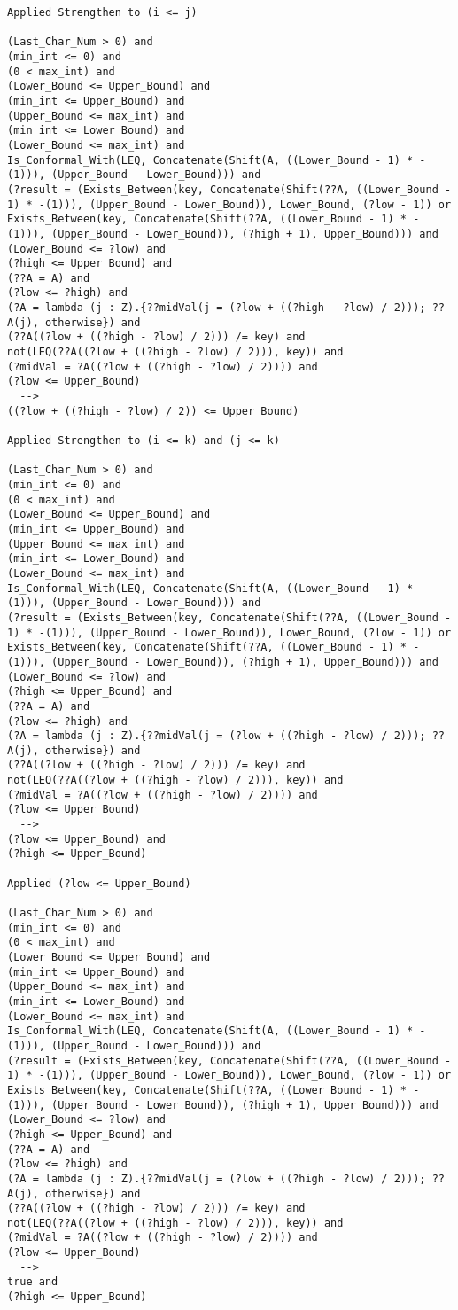 \begin{lstlisting}[language=resolve]
Applied Strengthen to (i <= j)

(Last_Char_Num > 0) and
(min_int <= 0) and
(0 < max_int) and
(Lower_Bound <= Upper_Bound) and
(min_int <= Upper_Bound) and
(Upper_Bound <= max_int) and
(min_int <= Lower_Bound) and
(Lower_Bound <= max_int) and
Is_Conformal_With(LEQ, Concatenate(Shift(A, ((Lower_Bound - 1) * -(1))), (Upper_Bound - Lower_Bound))) and
(?result = (Exists_Between(key, Concatenate(Shift(??A, ((Lower_Bound - 1) * -(1))), (Upper_Bound - Lower_Bound)), Lower_Bound, (?low - 1)) or Exists_Between(key, Concatenate(Shift(??A, ((Lower_Bound - 1) * -(1))), (Upper_Bound - Lower_Bound)), (?high + 1), Upper_Bound))) and
(Lower_Bound <= ?low) and
(?high <= Upper_Bound) and
(??A = A) and
(?low <= ?high) and
(?A = lambda (j : Z).{??midVal(j = (?low + ((?high - ?low) / 2))); ??A(j), otherwise}) and
(??A((?low + ((?high - ?low) / 2))) /= key) and
not(LEQ(??A((?low + ((?high - ?low) / 2))), key)) and
(?midVal = ?A((?low + ((?high - ?low) / 2)))) and
(?low <= Upper_Bound)
  -->
((?low + ((?high - ?low) / 2)) <= Upper_Bound)

Applied Strengthen to (i <= k) and (j <= k)

(Last_Char_Num > 0) and
(min_int <= 0) and
(0 < max_int) and
(Lower_Bound <= Upper_Bound) and
(min_int <= Upper_Bound) and
(Upper_Bound <= max_int) and
(min_int <= Lower_Bound) and
(Lower_Bound <= max_int) and
Is_Conformal_With(LEQ, Concatenate(Shift(A, ((Lower_Bound - 1) * -(1))), (Upper_Bound - Lower_Bound))) and
(?result = (Exists_Between(key, Concatenate(Shift(??A, ((Lower_Bound - 1) * -(1))), (Upper_Bound - Lower_Bound)), Lower_Bound, (?low - 1)) or Exists_Between(key, Concatenate(Shift(??A, ((Lower_Bound - 1) * -(1))), (Upper_Bound - Lower_Bound)), (?high + 1), Upper_Bound))) and
(Lower_Bound <= ?low) and
(?high <= Upper_Bound) and
(??A = A) and
(?low <= ?high) and
(?A = lambda (j : Z).{??midVal(j = (?low + ((?high - ?low) / 2))); ??A(j), otherwise}) and
(??A((?low + ((?high - ?low) / 2))) /= key) and
not(LEQ(??A((?low + ((?high - ?low) / 2))), key)) and
(?midVal = ?A((?low + ((?high - ?low) / 2)))) and
(?low <= Upper_Bound)
  -->
(?low <= Upper_Bound) and
(?high <= Upper_Bound)

Applied (?low <= Upper_Bound)

(Last_Char_Num > 0) and
(min_int <= 0) and
(0 < max_int) and
(Lower_Bound <= Upper_Bound) and
(min_int <= Upper_Bound) and
(Upper_Bound <= max_int) and
(min_int <= Lower_Bound) and
(Lower_Bound <= max_int) and
Is_Conformal_With(LEQ, Concatenate(Shift(A, ((Lower_Bound - 1) * -(1))), (Upper_Bound - Lower_Bound))) and
(?result = (Exists_Between(key, Concatenate(Shift(??A, ((Lower_Bound - 1) * -(1))), (Upper_Bound - Lower_Bound)), Lower_Bound, (?low - 1)) or Exists_Between(key, Concatenate(Shift(??A, ((Lower_Bound - 1) * -(1))), (Upper_Bound - Lower_Bound)), (?high + 1), Upper_Bound))) and
(Lower_Bound <= ?low) and
(?high <= Upper_Bound) and
(??A = A) and
(?low <= ?high) and
(?A = lambda (j : Z).{??midVal(j = (?low + ((?high - ?low) / 2))); ??A(j), otherwise}) and
(??A((?low + ((?high - ?low) / 2))) /= key) and
not(LEQ(??A((?low + ((?high - ?low) / 2))), key)) and
(?midVal = ?A((?low + ((?high - ?low) / 2)))) and
(?low <= Upper_Bound)
  -->
true and
(?high <= Upper_Bound)


\end{lstlisting}
